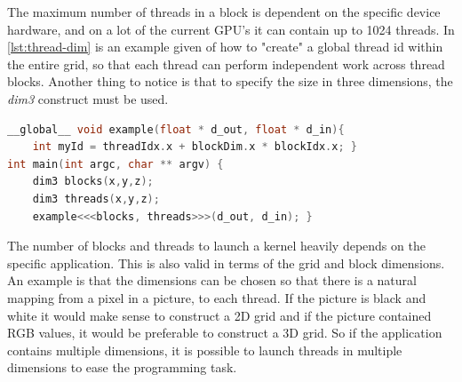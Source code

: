 The maximum number of threads in a block is dependent on the specific device hardware, and on a lot of the current GPU's it can contain up to 1024 threads\cite{cuda:programmingguide}.
In \autoref{lst:thread-dim} is an example given of how to "create" a global thread id within the entire grid, so that each thread can perform independent work across thread blocks.
Another thing to notice is that to specify the size in three dimensions, the \textit{dim3} construct must be used.
\begin{lstlisting}[language=C,caption={Example of thread id usage in a grid of multiple thread blocks},label=lst:thread-dim]
__global__ void example(float * d_out, float * d_in){
	int myId = threadIdx.x + blockDim.x * blockIdx.x; }
int main(int argc, char ** argv) {
	dim3 blocks(x,y,z);
	dim3 threads(x,y,z);
	example<<<blocks, threads>>>(d_out, d_in); }
\end{lstlisting}
The number of blocks and threads to launch a kernel heavily depends on the specific application.
This is also valid in terms of the grid and block dimensions.
An example is that the dimensions can be chosen so that there is a natural mapping from a pixel in a picture, to each thread.
If the picture is black and white it would make sense to construct a 2D grid and if the picture contained RGB values, it would be preferable to construct a 3D grid.
So if the application contains multiple dimensions, it is possible to launch threads in multiple dimensions to ease the programming task.


